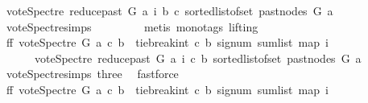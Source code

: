 \begin{isabellebody}
\ {\isacharparenleft}{\kern0pt}vote{\isacharunderscore}{\kern0pt}Spectre\ {\isacharparenleft}{\kern0pt}reduce{\isacharunderscore}{\kern0pt}past\ G\ a{\isacharparenright}{\kern0pt}\ i\ b\ c{\isacharparenright}{\kern0pt}{\isacharparenright}{\kern0pt}\ {\isacharparenleft}{\kern0pt}sorted{\isacharunderscore}{\kern0pt}list{\isacharunderscore}{\kern0pt}of{\isacharunderscore}{\kern0pt}set\ {\isacharparenleft}{\kern0pt}past{\isacharunderscore}{\kern0pt}nodes\ G\ a{\isacharparenright}{\kern0pt}{\isacharparenright}{\kern0pt}{\isacharparenright}{\kern0pt}{\isacharparenright}{\kern0pt}{\isacharparenright}{\kern0pt}{\isachardoublequoteclose}\isanewline
\ \ \ \ \ \ \isamarkupfalse%
\ vote{\isacharunderscore}{\kern0pt}Spectre{\isachardot}{\kern0pt}simps\ \isanewline
\ \ \ \ \ \ \isamarkupfalse%
\ {\isacharparenleft}{\kern0pt}metis\ {\isacharparenleft}{\kern0pt}mono{\isacharunderscore}{\kern0pt}tags{\isacharcomma}{\kern0pt}\ lifting{\isacharparenright}{\kern0pt}{\isacharparenright}{\kern0pt}\ \isanewline
\ \ \ \ \isamarkupfalse%
\ ff{}{\isacharcolon}{\kern0pt}\ {\isachardoublequoteopen}vote{\isacharunderscore}{\kern0pt}Spectre\ G\ a\ c\ b\ {\isacharequal}{\kern0pt}\ tie{\isacharunderscore}{\kern0pt}break{\isacharunderscore}{\kern0pt}int\ c\ b\ {\isacharparenleft}{\kern0pt}signum\ {\isacharparenleft}{\kern0pt}sum{\isacharunderscore}{\kern0pt}list\ {\isacharparenleft}{\kern0pt}map\ {\isacharparenleft}{\kern0pt}{\isasymlambda}i{\isachardot}{\kern0pt}\isanewline
\ \ \ \ \ \ {\isacharparenleft}{\kern0pt}vote{\isacharunderscore}{\kern0pt}Spectre\ {\isacharparenleft}{\kern0pt}reduce{\isacharunderscore}{\kern0pt}past\ G\ a{\isacharparenright}{\kern0pt}\ i\ c\ b{\isacharparenright}{\kern0pt}{\isacharparenright}{\kern0pt}\ {\isacharparenleft}{\kern0pt}sorted{\isacharunderscore}{\kern0pt}list{\isacharunderscore}{\kern0pt}of{\isacharunderscore}{\kern0pt}set\ {\isacharparenleft}{\kern0pt}past{\isacharunderscore}{\kern0pt}nodes\ G\ a{\isacharparenright}{\kern0pt}{\isacharparenright}{\kern0pt}{\isacharparenright}{\kern0pt}{\isacharparenright}{\kern0pt}{\isacharparenright}{\kern0pt}{\isachardoublequoteclose}\isanewline
\ \ \ \ \ \ \isamarkupfalse%
\ vote{\isacharunderscore}{\kern0pt}Spectre{\isachardot}{\kern0pt}simps\ three\ \isamarkupfalse%
\ fastforce\ \isanewline
\ \ \ \ \isamarkupfalse%
\ \isamarkupfalse%
\ ff{}{\isacharcolon}{\kern0pt}\ {\isachardoublequoteopen}vote{\isacharunderscore}{\kern0pt}Spectre\ G\ a\ c\ b\ {\isacharequal}{\kern0pt}\ tie{\isacharunderscore}{\kern0pt}break{\isacharunderscore}{\kern0pt}int\ c\ b\ {\isacharparenleft}{\kern0pt}signum\ {\isacharparenleft}{\kern0pt}sum{\isacharunderscore}{\kern0pt}list\ {\isacharparenleft}{\kern0pt}map\ {\isacharparenleft}{\kern0pt}{\isasymlambda}i{\isachardot}{\kern0pt}\isanewline

\end{isabellebody}
